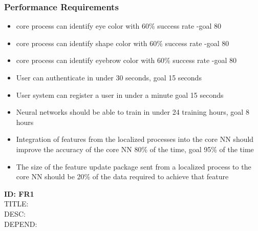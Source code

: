 \documentclass[onecolumn, draftclsnofoot,10pt, compsoc]{IEEEtran}
\begin{document}
	\subsubsection{Performance Requirements}
	\begin{itemize}
		\item core process can identify eye color with 60\% success rate -goal 80%
		\item core process can identify shape color with 60\% success rate -goal 80%
		\item core process can identify eyebrow color with 60\% success rate -goal 80%
		\item User can authenticate in under 30 seconds, goal 15 seconds
		\item User system can register a user in under a minute goal 15 seconds
		\item Neural networks should be able to train in under 24 training hours, goal 8 hours
		\item Integration of features from the localized processes into the core NN should improve the accuracy of the core NN 80\% of the time, goal 95\% of the time
		\item The size of the feature update package sent from a localized process to the core NN should be 20\% of the data required to achieve that feature
	\end{itemize}
\textbf{ID: FR1} \\
	TITLE: \\
	DESC: \\
	DEPEND: \\

	\newpage
\end{document}
